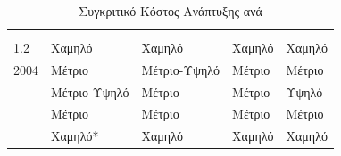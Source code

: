 \begin{table}[H]
\centering
\caption{Συγκριτικό Κόστος Ανάπτυξης ανά }
\label{tab:development_costs}
\small
\setlength{\tabcolsep}{5pt}
\renewcommand{\arraystretch}{1.25}
\begin{chaptertablebox}
\begin{tabularx}{\textwidth}{|Y|>{\centering\arraybackslash}p{2.2cm}|>{\centering\arraybackslash}p{2.2cm}|>{\centering\arraybackslash}p{2.2cm}|>{\centering\arraybackslash}p{2.2cm}|}
\hline
\textbf{} & \textbf{ } & \textbf{} & \textbf{ } & \textbf{} \\
\hline
{} 1.2 & Χαμηλό & Χαμηλό & Χαμηλό & Χαμηλό \\
 2004 & Μέτριο & Μέτριο-Υψηλό & Μέτριο & Μέτριο \\
 & Μέτριο-Υψηλό & Μέτριο & Μέτριο & Υψηλό \\
 & Μέτριο & Μέτριο & Μέτριο & Μέτριο \\
 & Χαμηλό* & Χαμηλό & Χαμηλό & Χαμηλό \\
\hline
\end{tabularx}
\end{chaptertablebox}
\end{table}

